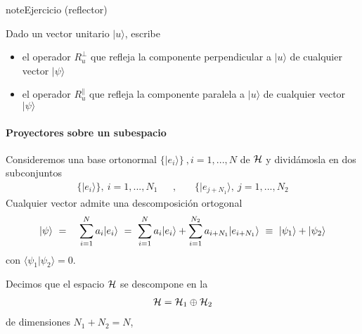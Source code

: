 \documentclass[letterpaper,10pt,english]{jupyterBook}
\newcommand{\ket}[1]{|#1\rangle}
\newcommand{\braket}[2]{\langle #1|#2\rangle}
\newcommand{\Hil}{{\cal H}}
\begin{document}
\begin{sphinxadmonition}{note}{Ejercicio (reflector) }

\sphinxAtStartPar
Dado un vector unitario \(\ket{u}\), escribe
\begin{itemize}
\item {} 
\sphinxAtStartPar
el operador \(R_u^{\perp}\) que refleja la componente perpendicular a \(\ket{u}\) de cualquier  vector \(\ket{\psi}\)

\item {} 
\sphinxAtStartPar
el operador \(R_{u}^{\|}\) que refleja la componente paralela a \(\ket{u}\) de cualquier  vector \(\ket{\psi}\)

\end{itemize}
\end{sphinxadmonition}


\paragraph{Proyectores sobre un subespacio}
\label{\detokenize{docs/Part_01_Formalismo/Chapter_01_02_Formalismo_matem_xe1tico/01_03_Operadores_myst:proyectores-sobre-un-subespacio}}
\sphinxAtStartPar
Consideremos una base ortonormal \(\{\ket{e_i}\}~,i=1,...,N \)  de \(\Hil\) y dividámosla en dos subconjuntos
\begin{equation*}
\begin{split}
\{\ket{e_i}\},~ i=1,...,N_1 ~~~~~~~,~~~~~~~~\{\ket{e_{j+N_1}},~j=1,...,N_2   
\end{split}
\end{equation*}
\sphinxAtStartPar
Cualquier vector admite una descomposición ortogonal
\label{equation:docs/Part_01_Formalismo/Chapter_01_02_Formalismo_matemático/01_03_Operadores_myst:90273f2c-9458-4320-8258-d3b9abf60fef}\begin{eqnarray}
\ket{\psi} &~=~& \sum_{i=1}^N a_i \ket{e_i}   ~= ~ \sum_{i=1}^N a_i \ket{e_i} + \sum_{i=1}^{N_2} a_{i+N_1} \ket{e_{i+N_1}} ~\equiv ~ \ket{\psi_1} + \ket{\psi_2}\rule{0mm}{5mm}
\end{eqnarray}
\sphinxAtStartPar
con \(\braket{\psi_1}{\psi_2} = 0\).

\sphinxAtStartPar
Decimos que el espacio \(\Hil\) se descompone en la 
\begin{equation*}
\begin{split}
\Hil = \Hil_1 \oplus \Hil_2 
\end{split}
\end{equation*}
\sphinxAtStartPar
de dimensiones \(N_1 + N_2 = N\),
\end{document}
